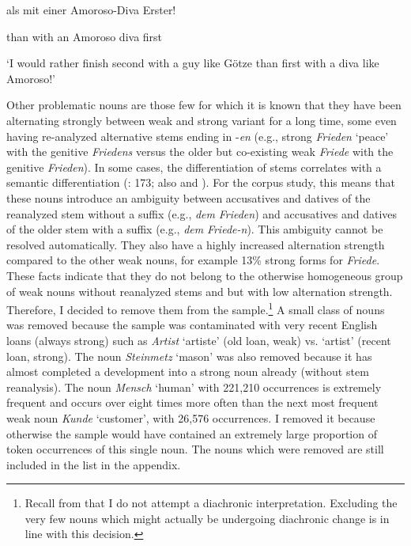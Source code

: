 \begin{styleMoutonExampleAlpha}
als  mit  einer    Amoroso-Diva  Erster!
\end{styleMoutonExampleAlpha}

\begin{styleMoutonExampleAlpha}
than  with  an    Amoroso diva  first
\end{styleMoutonExampleAlpha}

\begin{styleMoutonExampleAlpha}
‘I would rather finish second with a guy like Götze than first with a diva like Amoroso!’
\end{styleMoutonExampleAlpha}

\begin{styleMoutonTextAfterExample}
Other problematic nouns are those few for which it is known that they have been alternating strongly between weak and strong variant for a long time, some even having re-analyzed alternative stems ending in \nobreakdash-\textit{en} (e.g., strong \textit{Frieden} ‘peace’ with the genitive \textit{Friedens} versus the older but co-existing weak \textit{Friede} with the genitive \textit{Frieden}). In some cases, the differentiation of stems correlates with a semantic differentiation (\citealt{Köpcke1995}: 173; also \citealt{Wurzel1985} and \citealt{Joeres1996}). For the corpus study, this means that these nouns introduce an ambiguity between accusatives and datives of the reanalyzed stem without a suffix (e.g., \textit{dem} \textit{Frieden}) and accusatives and datives of the older stem with a suffix (e.g., \textit{dem} \textit{Friede\nobreakdash-n}). This ambiguity cannot be resolved automatically. They also have a highly increased alternation strength compared to the other weak nouns, for example 13\% strong forms for \textit{Friede}. These facts indicate that they do not belong to the otherwise homogeneous group of weak nouns without reanalyzed stems and but with low alternation strength. Therefore, I decided to remove them from the sample.\footnote{Recall from  that I do not attempt a diachronic interpretation. Excluding the very few nouns which might actually be undergoing diachronic change is in line with this decision.} A small class of nouns was removed because the sample was contaminated with very recent English loans (always strong) such as \textit{Artist} ‘artiste’ (old loan, weak) vs. ‘artist’ (recent loan, strong). The noun \textit{Steinmetz} ‘mason’ was also removed because it has almost completed a development into a strong noun already (without stem reanalysis). The noun \textit{Mensch} ‘human’ with 221,210 occurrences is extremely frequent and occurs over eight times more often than the next most frequent weak noun \textit{Kunde} ‘customer’, with 26,576 occurrences. I removed it because otherwise the sample would have contained an extremely large proportion of token occurrences of this single noun. The nouns which were removed are still included in the list in the appendix.
\end{styleMoutonTextAfterExample}

